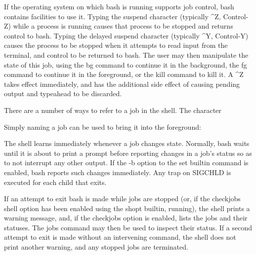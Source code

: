 \documentclass[11pt]{article}
\begin{document}
{{{If the operating system on which bash is running supports job control, bash contains facilities to use it. Typing the suspend character (typically ^Z, Control-Z) while a process is running causes that process to be stopped and returns control to bash. Typing the delayed suspend character (typically ^Y, Control-Y) causes the process to be stopped when it attempts to read input from the terminal, and control to be returned to bash. The user may then manipulate the state of this job, using the bg command to continue it in the background, the fg command to continue it in the foreground, or the kill command to kill it. A ^Z takes effect immediately, and has the additional side effect of causing pending output and typeahead to be discarded.

There are a number of ways to refer to a job in the shell. The character %

Simply naming a job can be used to bring it into the foreground: %

The shell learns immediately whenever a job changes state. Normally, bash waits until it is about to print a prompt before reporting changes in a job's status so as to not interrupt any other output. If the -b option to the set builtin command is enabled, bash reports such changes immediately. Any trap on SIGCHLD is executed for each child that exits.

If an attempt to exit bash is made while jobs are stopped (or, if the checkjobs shell option has been enabled using the shopt builtin, running), the shell prints a warning message, and, if the checkjobs option is enabled, lists the jobs and their statuses. The jobs command may then be used to inspect their status. If a second attempt to exit is made without an intervening command, the shell does not print another warning, and any stopped jobs are terminated.

}}}
\end{document}
